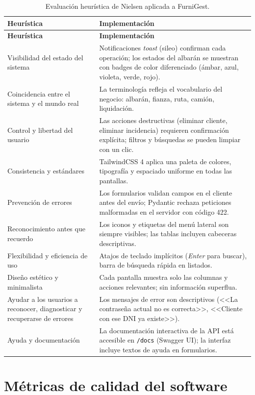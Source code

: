 \documentclass[12pt,twoside,titlepage]{report}
\begin{document}
\begin{longtable}{p{4.5cm}p{8.5cm}}
  \caption{Evaluación heurística de Nielsen aplicada a FurniGest.} \label{tab:nielsen} \\
  \toprule
  \textbf{Heurística} & \textbf{Implementación} \\
  \midrule
  \endfirsthead
  \toprule
  \textbf{Heurística} & \textbf{Implementación} \\
  \midrule
  \endhead
  Visibilidad del estado del sistema & Notificaciones \emph{toast} (sileo) confirman cada operación; los estados del albarán se muestran con badges de color diferenciado (ámbar, azul, violeta, verde, rojo). \\
  Coincidencia entre el sistema y el mundo real & La terminología refleja el vocabulario del negocio: albarán, fianza, ruta, camión, liquidación. \\
  Control y libertad del usuario & Las acciones destructivas (eliminar cliente, eliminar incidencia) requieren confirmación explícita; filtros y búsquedas se pueden limpiar con un clic. \\
  Consistencia y estándares & TailwindCSS 4 aplica una paleta de colores, tipografía y espaciado uniforme en todas las pantallas. \\
  Prevención de errores & Los formularios validan campos en el cliente antes del envío; Pydantic rechaza peticiones malformadas en el servidor con código 422. \\
  Reconocimiento antes que recuerdo & Los iconos y etiquetas del menú lateral son siempre visibles; las tablas incluyen cabeceras descriptivas. \\
  Flexibilidad y eficiencia de uso & Atajos de teclado implícitos (\emph{Enter} para buscar), barra de búsqueda rápida en listados. \\
  Diseño estético y minimalista & Cada pantalla muestra solo las columnas y acciones relevantes; sin información superflua. \\
  Ayudar a los usuarios a reconocer, diagnosticar y recuperarse de errores & Los mensajes de error son descriptivos (<<La contraseña actual no es correcta>>, <<Cliente con ese DNI ya existe>>). \\
  Ayuda y documentación & La documentación interactiva de la API está accesible en \texttt{/docs} (Swagger UI); la interfaz incluye textos de ayuda en formularios. \\
  \bottomrule
\end{longtable}


\section{Métricas de calidad del software}
\end{document}

